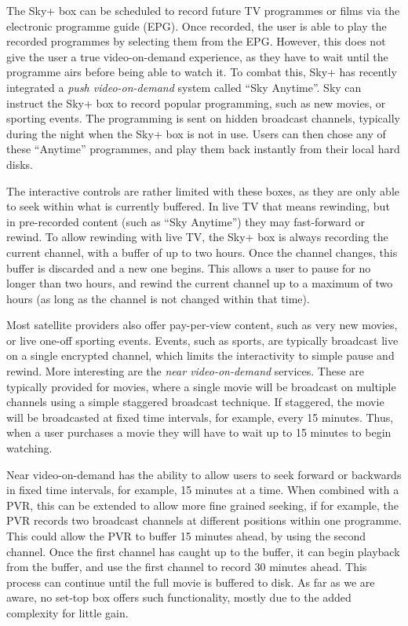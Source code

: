     The Sky+ box can be scheduled to record future TV programmes or films via the electronic programme guide (EPG). Once recorded, the user is able to play the recorded programmes by selecting them from the EPG. However, this does not give the user a true video-on-demand experience, as they have to wait until the programme airs before being able to watch it. To combat this, Sky+ has recently integrated a \emph{push video-on-demand} system called ``Sky Anytime''. Sky can instruct the Sky+ box to record popular programming, such as new movies, or sporting events. The programming is sent on hidden broadcast channels, typically during the night when the Sky+ box is not in use. Users can then chose any of these ``Anytime'' programmes, and play them back instantly from their local hard disks.

    The interactive controls are rather limited with these boxes, as they are only able to seek within what is currently buffered. In live TV that means rewinding, but in pre-recorded content (such as ``Sky Anytime'') they may fast-forward or rewind. To allow rewinding with live TV, the Sky+ box is always recording the current channel, with a buffer of up to two hours. Once the channel changes, this buffer is discarded and a new one begins. This allows a user to pause for no longer than two hours, and rewind the current channel up to a maximum of two hours (as long as the channel is not changed within that time).

    Most satellite providers also offer pay-per-view content, such as very new movies, or live one-off sporting events. Events, such as sports, are typically broadcast live on a single encrypted channel, which limits the interactivity to simple pause and rewind. More interesting are the \emph{near video-on-demand} services. These are typically provided for movies, where a single movie will be broadcast on multiple channels using a simple staggered broadcast technique. If staggered, the movie will be broadcasted at fixed time intervals, for example, every 15 minutes. Thus, when a user purchases a movie they will have to wait up to 15 minutes to begin watching.

    Near video-on-demand has the ability to allow users to seek forward or backwards in fixed time intervals, for example, 15 minutes at a time. When combined with a PVR, this can be extended to allow more fine grained seeking, if for example, the PVR records two broadcast channels at different positions within one programme. This could allow the PVR to buffer 15 minutes ahead, by using the second channel. Once the first channel has caught up to the buffer, it can begin playback from the buffer, and use the first channel to record 30 minutes ahead. This process can continue until the full movie is buffered to disk. As far as we are aware, no set-top box offers such functionality, mostly due to the added complexity for little gain.


